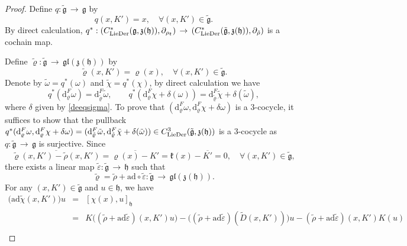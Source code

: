 \documentclass[12pt]{amsart}
\newcommand{\lon }{\,\rightarrow\,}
\newcommand{\g}{\mathfrak g}
\newcommand{\h}{\mathfrak h}
\newcommand{\frkk}{\mathfrak k}
\newcommand{\frkz}{\mathfrak z}
\newcommand{\dM}{\mathrm{d}}
\newcommand{\LD}{{\rm LieDer }}
\newcommand{\gl}{\mathfrak {gl}}
\newcommand{\ad}{\mathrm{ad}}
\begin{document}
\begin{proof}
    Define $q:\tilde{\g}\lon\g$ by $$q(x, K')=x,\quad\forall (x, K')\in\tilde{\g}.$$ By direct calculation, $q^*:(C^*_{\LD}(\g, \frkz(\h)), \partial_{\rho_\frkk})\lon (C_{\LD}^*(\tilde{\g}, \frkz(\h)), \partial_{\tilde{\rho}})$ is a cochain map. 
    
     Define $\tilde{\varrho}:\tilde{\g}\lon\gl(\frkz(\h))$ by 
    $$
    \tilde{\varrho}(x, K')=\varrho(x), \quad\forall (x, K')\in\tilde{\g}.
    $$ 
Denote by $\tilde{\omega}=q^*(\omega)$ and $\tilde{\chi}=q^*(\chi)$, by direct calculation we have \begin{equation*}
        q^*(\dM^{F}_{\varrho}\omega)=\dM^{F}_{\tilde{\varrho}}\tilde{\omega}, \quad \quad q^*(\dM^{F}_{\varrho}\chi+\delta(\omega))=\dM^{F}_{\tilde{\varrho}}\tilde{
        \chi}+\delta(\tilde{\omega}),
    \end{equation*}
    where $\delta$ given by \eqref{deeqsigma}. To prove that $(\dM^F_{\varrho}\omega,\dM^F_{\varrho}\chi+\delta\omega)$ is a 3-cocycle, it suffices to show that the pullback $q^*(\dM^F_{\varrho}\omega,\dM^F_{\varrho}\chi+\delta\omega)=(\dM^{F}_{\tilde{\varrho}}\tilde{\omega}, \dM^{F}_{\tilde{\varrho}}\tilde{\chi}+\delta(\tilde{\omega}))\in C^3_{\LD}(\tilde{\g},\frkz(\h))$ is a $3$-cocycle as $q:\tilde{\g}\lon\g$ is surjective. Since $$\overline{\tilde{\varrho}(x,K')-\tilde{\rho}(x,K')}=\overline{\varrho(x)-K'}=\frkk(x)-\overline{K'}=0,\quad \forall(x,K')\in\tilde{\g},$$ there exists a linear map $\tilde{\varepsilon}:\tilde{\g}\lon\h$ such that 
    \begin{equation}\label{varrhorho}
        \tilde{\varrho}=\tilde{\rho}+\ad\circ\tilde{\varepsilon}:\tilde{\g}\lon\gl(\frkz(\h)).
    \end{equation} 
For any $(x, K')\in\tilde{\g}$ and $u\in\h$, we have
    \begin{eqnarray*}
        \Big(\ad \tilde{\chi}(x,K')\Big)u&=&[\chi(x), u]_\h\\%
        &=&K\Big((\tilde{\rho}+\ad\tilde{\varepsilon})(x,K')u\Big)-\Big((\tilde{\rho}+\ad\tilde{\varepsilon})(\tilde{D}(x,K'))\Big)u-(\tilde{\rho}+\ad\tilde{\varepsilon})(x,K')K(u)\\

\end{eqnarray*}
\end{proof}
\end{document}

